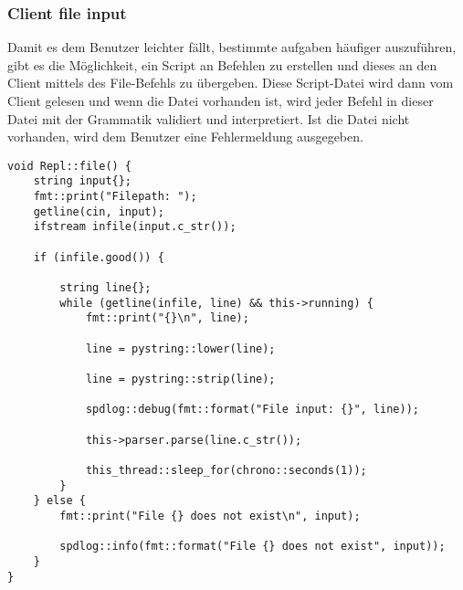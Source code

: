 \subsubsection{Client file input}
Damit es dem Benutzer leichter fällt, bestimmte aufgaben häufiger auszuführen, gibt es die Möglichkeit, ein Script an Befehlen zu erstellen und dieses an den Client mittels des File-Befehls zu übergeben. Diese Script-Datei wird dann vom Client gelesen und wenn die Datei vorhanden ist, wird jeder Befehl in dieser Datei mit der Grammatik validiert und interpretiert. Ist die Datei nicht vorhanden, wird dem Benutzer eine Fehlermeldung ausgegeben.

\vspace{10mm}
\begin{addmargin}[-3em]{0em}
\begin{verbatim}
void Repl::file() {
    string input{};
    fmt::print("Filepath: ");
    getline(cin, input);
    ifstream infile(input.c_str());
    
    if (infile.good()) {

        string line{};
        while (getline(infile, line) && this->running) {
            fmt::print("{}\n", line);

            line = pystring::lower(line);

            line = pystring::strip(line);

            spdlog::debug(fmt::format("File input: {}", line));

            this->parser.parse(line.c_str());

            this_thread::sleep_for(chrono::seconds(1));
        }
    } else {
        fmt::print("File {} does not exist\n", input);

        spdlog::info(fmt::format("File {} does not exist", input));
    }
}

\end{verbatim}
\end{addmargin}


